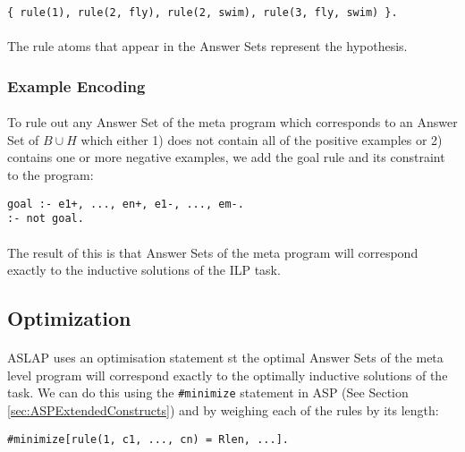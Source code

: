 \documentclass{article}
\theoremstyle{plain}
\theoremstyle{definition}
\begin{document}
\begin{multicols}{2}
\begin{lstlisting}
{ rule(1), rule(2, fly), rule(2, swim), rule(3, fly, swim) }.
\end{lstlisting}

\paragraph{} The rule atoms that appear in the Answer Sets represent the hypothesis. 

\subsubsection{Example Encoding}

\paragraph{} To rule out any Answer Set of the meta program which corresponds to an Answer Set of $B \cup H$ which either 1) does not contain all of the positive examples or 2) contains one or more negative examples, we add the goal rule and its constraint to the program:

\begin{lstlisting}
goal :- e1+, ..., en+, e1-, ..., em-.
:- not goal.
\end{lstlisting}

\paragraph{} The result of this is that Answer Sets of the meta program will correspond exactly to the inductive solutions of the ILP task. 

\subsection{Optimization}

\paragraph{} ASLAP uses an optimisation statement st the optimal Answer Sets of the meta level program will correspond exactly to the optimally inductive solutions of the task. We can do this using the \lstinline{#minimize} statement in ASP (See Section \ref{sec:ASPExtendedConstructs}) and by weighing each of the rules by its length:

\begin{lstlisting}
#minimize[rule(1, c1, ..., cn) = Rlen, ...].
\end{lstlisting}


\end{multicols}
\end{document}
